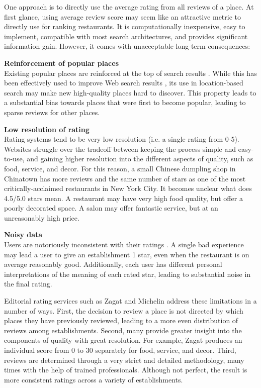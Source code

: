 One approach is to directly use the average rating from all reviews of a place.
At first glance, using average review score may seem like an attractive
metric to directly use for ranking restaurants.
It is computationally inexpensive, easy to implement, compatible with
most search architectures, and provides significant information gain.
However, it comes with unacceptable long-term consequences:
\squishlist
\item {\bf Reinforcement of popular places} \\
Existing popular places are reinforced at the top of search results \cite{cho2004,cho2005}.
While this has been effectively used to improve Web search results \cite{xue2004},
its use in location-based search may make new high-quality places hard to discover.
This property leads to a substantial bias towards places that were first to become popular,
leading to sparse reviews for other places.
\item {\bf Low resolution of rating} \\
Rating systems tend to be very low resolution (i.e. a single rating from 0-5).
Websites struggle over the tradeoff between keeping the process simple and easy-to-use,
and gaining higher resolution into the different aspects of quality, such as food, service, and decor.
For this reason, a small Chinese dumpling shop in Chinatown has more reviews and the same number
of stars as one of the most critically-acclaimed restaurants in New York City.
It becomes unclear what does 4.5/5.0 stars mean.
A restaurant may have very high food quality, but offer a poorly decorated space.
A salon may offer fantastic service, but at an unreasonably high price.
\item {\bf Noisy data} \\
Users are notoriously inconsistent with their ratings \cite{chevalier2003effect}.
A single bad experience may lead a user to give an establishment 1 star, even when
the restaurant is on average reasonably good.
Additionally, each user has different personal interpretations of the meaning of each rated star,
leading to substantial noise in the final rating.
\squishend

Editorial rating services such as Zagat and Michelin address these limitations in a number of ways.
First, the decision to review a place is not directed by which places they have previously reviewed,
leading to a more even distribution of reviews among establishments.
Second, many provide greater insight into the components of quality with great resolution.
For example, Zagat produces an individual score from 0 to 30 separately for food, service, and decor.
Third, reviews are determined through a very strict and detailed methodology, many times with
the help of trained professionals.
Although not perfect, the result is more consistent ratings across a variety of establishments.

